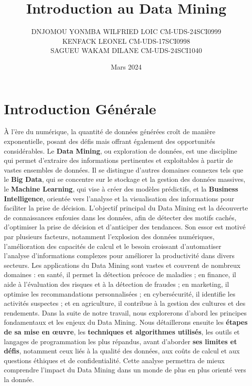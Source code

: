 \documentclass[a4paper,12pt]{report}
\title{ Introduction au Data Mining}
\author{DNJOMOU YONMBA WILFRIED LOIC CM-UDS-24SCI0999 \\
KENFACK LEONEL CM-UDS-17SCI0998\\
SAGUEU WAKAM DILANE CM-UDS-24SCI1040\\}
\date{Mars 2024}
\begin{document}
\maketitle

\renewcommand{\contentsname}{Table des matières}

\tableofcontents

\renewcommand{\chaptername}{Chapitre}

\chapter*{Introduction Générale}
	À l’ère du numérique, la quantité de données générées croît de manière exponentielle, posant des défis mais offrant également des opportunités considérables. Le \textbf{Data Mining}, ou exploration de données, est une discipline qui permet d’extraire des informations pertinentes et exploitables à partir de vastes ensembles de données. Il se distingue d’autres domaines connexes tels que le \textbf{Big Data}, qui se concentre sur le stockage et la gestion des données massives, le \textbf{Machine Learning}, qui vise à créer des modèles prédictifs, et la \textbf{Business Intelligence}, orientée vers l’analyse et la visualisation des informations pour faciliter la prise de décision. L’objectif principal du Data Mining est la découverte de connaissances enfouies dans les données, afin de détecter des motifs cachés, d’optimiser la prise de décision et d’anticiper des tendances. Son essor est motivé par plusieurs facteurs, notamment l’explosion des données numériques, l’amélioration des capacités de calcul et le besoin croissant d’automatiser l’analyse d’informations complexes pour améliorer la productivité dans divers secteurs. Les applications du Data Mining sont vastes et couvrent de nombreux domaines : en santé, il permet la détection précoce de maladies ; en finance, il aide à l’évaluation des risques et à la détection de fraudes ; en marketing, il optimise les recommandations personnalisées ; en cybersécurité, il identifie les activités suspectes ; et en agriculture, il contribue à la gestion des cultures et des rendements. Dans la suite de notre travail, nous explorerons d’abord les principes fondamentaux et les enjeux du Data Mining. Nous détaillerons ensuite les \textbf{étapes de sa mise en œuvre}, les \textbf{techniques et algorithmes utilisés}, les outils et langages de programmation les plus répandus, avant d’aborder \textbf{ses limites et défis}, notamment ceux liés à la qualité des données, aux coûts de calcul et aux questions éthiques et de confidentialité. Cette analyse permettra de mieux comprendre l’impact du Data Mining dans un monde de plus en plus orienté vers la donnée.
\newpage
\end{document}
